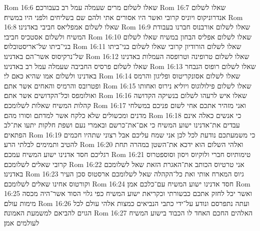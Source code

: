 Rom 16:6  שאלו לשלום מרים שעמלה עמל רב בעבורכם׃
Rom 16:7  שאלו לשלום אנדרוניקוס ויוניס קרובי ואשר היו אסורים אתי ולהם שם בשליחים ולפני היו במשיח׃
Rom 16:8  שאלו לשלום אמפליאס חביבי באדנינו׃
Rom 16:9  שאלו לשלום אורבנוס חברנו בעבודת המשיח ולשלום אסטכיס חביבי׃
Rom 16:10  שאלו לשלום אפליס הבחון במשיח שאלו לשלום בני־ביתו של־אריסטובלוס׃
Rom 16:11  שאלו לשלום הורודיון קרובי שאלו לשלום בני־ביתו של־נרקיסוס אשר־הם באדנינו׃
Rom 16:12  שאלו לשלום טרופינה וטרופסה העמלות באדנינו שאלו לשלום פרסיס החביבה שעמלה עמל רב באדנינו׃
Rom 16:13  שאלו לשלום רופוס הנבחר באדנינו ולשלום אמו שהיא כאם לי׃
Rom 16:14  שאלו לשלום אסונקריטוס ופליגון והרמס ופטרובס והרמיס והאחים אשר אתם׃
Rom 16:15  שאלו לשלום פילולוגוס ויוליא נירוס ואחותו ואולומפס וכל־הקדושים אשר אתם׃
Rom 16:16  שאלו איש לרעהו לשלום בנשיקה הקדושה קהלות המשיח שאלות לשלומכם׃
Rom 16:17  ואני מזהיר אתכם אחי לשום פניכם במשלחי מדנים ומכשולים שלא כלקח אשר למדתם וסורו מהם׃
Rom 16:18  כי אנשים כאלה אינם עבדים את־אדנינו ישוע המשיח כי אם־את־כרשם ובאמרי נעם ושפת חלקות יתעו את־לב הפתאים׃
Rom 16:19  כי משמעתכם נודעת לכל לכן אני שמח עליכם אבל רצוני שתהיו חכמים להטיב ותמימים לבלתי הרע׃
Rom 16:20  ואלהי השלום הוא ידכא את־השטן במהרה תחת רגליכם חסד אדנינו ישוע המשיח עמכם׃
Rom 16:21  טימותיוס חברי ולוקיוס ויסון וסוספטרוס קרובי שאלים לשלומכם׃
Rom 16:22  אני טרטיוס הכותב את־האגרת הזאת שאל לשלומכם באדנינו׃
Rom 16:23  גיוס המארח אותי ואת כל־הקהלה שאל לשלומכם ארסטוס סכן העיר וקורטוס אחינו שאלים לשלומכם׃
Rom 16:24  חסד אדנינו ישוע המשיח עם־כלכם אמן׃
Rom 16:25  ואשר יכל לחזק אתכם כבשורתי וכקריאת ישוע המשיח כפי גלוי הסוד אשר־היה מכסה מימות עולם׃
Rom 16:26  ועתה נתפרסם ונודע על־ידי כתבי הנביאים כמצות אלהי עולם לכל הגוים להביאם למשמעת האמונה׃
Rom 16:27  האלהים החכם האחד לו הכבוד בישוע המשיח לעולמים אמן׃


